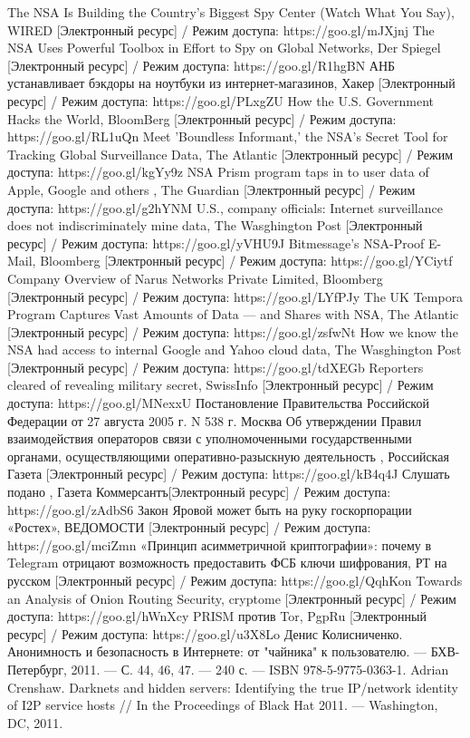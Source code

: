 \begin{thebibliography}{}
	  The NSA Is Building the Country’s Biggest Spy Center (Watch What You Say), WIRED [Электронный ресурс] / Режим доступа: https://goo.gl/mJXjnj
	 The NSA Uses Powerful Toolbox in Effort to Spy on Global Networks, Der Spiegel [Электронный ресурс] / Режим доступа: https://goo.gl/R1hgBN
	 АНБ устанавливает бэкдоры на ноутбуки из интернет-магазинов, Хакер [Электронный ресурс] / Режим доступа: https://goo.gl/PLxgZU
	 How the U.S. Government Hacks the World, BloomBerg [Электронный ресурс] / Режим доступа: https://goo.gl/RL1uQn
	 Meet 'Boundless Informant,' the NSA's Secret Tool for Tracking Global Surveillance Data, The Atlantic [Электронный ресурс] / Режим доступа: https://goo.gl/kgYy9z
	NSA Prism program taps in to user data of Apple, Google and others , The Guardian [Электронный ресурс] / Режим доступа: https://goo.gl/g2hYNM
	 U.S., company officials: Internet surveillance does not indiscriminately mine data, The Wasghington Post [Электронный ресурс] / Режим доступа: https://goo.gl/yVHU9J
	 Bitmessage's NSA-Proof E-Mail, Bloomberg [Электронный ресурс] / Режим доступа: https://goo.gl/YCiytf
	 Company Overview of Narus Networks Private Limited, Bloomberg [Электронный ресурс] / Режим доступа: https://goo.gl/LYfPJy
	 The UK Tempora Program Captures Vast Amounts of Data — and Shares with NSA, The Atlantic [Электронный ресурс] / Режим доступа: https://goo.gl/zsfwNt
	 How we know the NSA had access to internal Google and Yahoo cloud data, The Wasghington Post [Электронный ресурс] / Режим доступа: https://goo.gl/tdXEGb
	 Reporters cleared of revealing military secret, SwissInfo [Электронный ресурс] / Режим доступа: https://goo.gl/MNexxU
	 Постановление Правительства Российской Федерации от 27 августа 2005 г. N 538 г. Москва Об утверждении Правил взаимодействия операторов связи с уполномоченными государственными органами, осуществляющими оперативно-разыскную деятельность , Российская Газета  [Электронный ресурс] / Режим доступа: https://goo.gl/kB4q4J
	 Слушать подано ,  Газета  Коммерсантъ[Электронный ресурс] / Режим доступа: https://goo.gl/zAdbS6
	 Закон Яровой может быть на руку госкорпорации «Ростех»,    ВЕДОМОСТИ [Электронный ресурс] / Режим доступа: https://goo.gl/mciZmn
	 «Принцип асимметричной криптографии»: почему в Telegram отрицают возможность предоставить ФСБ ключи шифрования,    РТ на русском [Электронный ресурс] / Режим доступа: https://goo.gl/QqhKon
	 Towards	an	Analysis	of	Onion	Routing	Security,   cryptome [Электронный ресурс] / Режим доступа: https://goo.gl/hWnXcy
	  PRISM против Tor,   PgpRu [Электронный ресурс] / Режим доступа: https://goo.gl/u3X8Lo
	  Денис Колисниченко. Анонимность и безопасность в Интернете: от "чайника" к пользователю. — БХВ-Петербург, 2011. — С. 44, 46, 47. — 240 с. — ISBN 978-5-9775-0363-1.
	Adrian Crenshaw. Darknets and hidden servers: Identifying the true IP/network identity of I2P service hosts // In the Proceedings of Black Hat 2011. — Washington, DC, 2011.
\end{thebibliography}